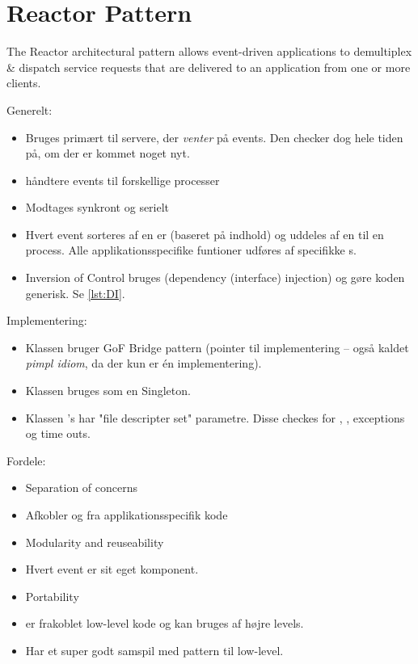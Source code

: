 \documentclass{article}
\begin{document}
\section{Reactor Pattern}

The Reactor architectural pattern allows event-driven applications to demultiplex \& dispatch service requests that are delivered to an application from one or more clients.

Generelt:
\begin{itemize}
	\item Bruges primært til servere, der \textit{venter} på events.
	Den checker dog hele tiden på, om der er kommet noget nyt.
	\item {} håndtere events til forskellige processer
	\item Modtages synkront og serielt
	\item Hvert event sorteres af en er (baseret på indhold) og uddeles af en  til en process. 
	Alle applikationsspecifike funtioner udføres af specifikke s.
	\item Inversion of Control bruges (dependency (interface) injection) og gøre koden generisk. Se \codeTitle \ref{lst:DI}.
\end{itemize}

Implementering:
\begin{itemize}
	\item Klassen  bruger GoF Bridge pattern (pointer til implementering -- også kaldet \emph{pimpl idiom}, da der kun er én implementering). 
	\item Klassen  bruges som en Singleton.
	\item Klassen 's  har "file descripter set"    parametre. 
	Disse checkes for , , exceptions og time outs.
\end{itemize}

Fordele:
\begin{itemize}
	\item Separation of concerns
	\item[] Afkobler  og  fra applikationsspecifik kode
	
	\item Modularity and reuseability
	\item[] Hvert event er sit eget komponent.

	\item Portability
	\item[]  er frakoblet low-level kode og kan bruges af højre levels.

	\item Har et super godt samspil med  pattern til low-level.
\end{itemize}
\end{document}

